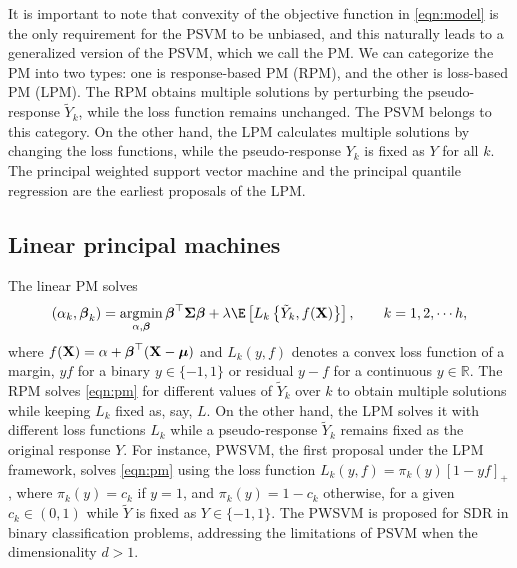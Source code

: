 It is important to note that convexity of the objective function in \eqref{eqn:model} is the only requirement for the PSVM to be unbiased, and this naturally leads to a generalized version of the PSVM, which we call the PM. We can categorize the PM into two types: one is response-based PM (RPM), and the other is loss-based PM (LPM). The RPM obtains multiple solutions by perturbing the pseudo-response $\tilde Y_k$, while the loss function remains unchanged. The PSVM belongs to this category. On the other hand, the LPM calculates multiple solutions by changing the loss functions, while the pseudo-response $Y_k$ is fixed as $Y$ for all $k$. The principal weighted support vector machine \citep[PWSVM,][]{shin2017principal} and the principal quantile regression \citep[PQR,][]{wang2018principal} are the earliest proposals of the LPM.  

\subsection{Linear principal machines} \label{sec:LPSDR}

The linear PM solves
\begin{align} \label{eqn:pm}
(\alpha_{k}, \bbeta_k) = \argmin_{\alpha, \bbeta} \bbeta^\top \bSigma\bbeta + \lambda \E \left[L_{k} \left\{\tilde Y_k, f(\bX)\right\} \right], \qquad k = 1, 2, \cdots h,
\end{align}
where $f(\mathbf{X}) = \alpha + \boldsymbol{\beta}^\top (\mathbf{X} - \boldsymbol{\mu})$ and $L_k(y, f)$ denotes a convex loss function of a margin, $yf$ for a binary $y \in \{-1, 1\}$ or residual $y - f$ for a continuous $y \in \mathbb{R}$. The RPM solves \eqref{eqn:pm} for different values of $\tilde Y_k$ over $k$ to obtain multiple solutions while keeping $L_k$ fixed as, say, $L$. On the other hand, the LPM  solves it with different loss functions $L_k$ while a pseudo-response $\tilde Y_k$ remains fixed as the original response $Y$. For instance, PWSVM, the first proposal under the LPM framework, solves \eqref{eqn:pm} using the loss function $L_k(y, f) = \pi_k(y)[1 - yf]_+$, where $\pi_k(y) = c_k$ if $y = 1$, and $\pi_k(y) = 1 - c_k$ otherwise, for a given $c_k \in (0,1)$ while $\tilde Y$ is fixed as $Y \in \{-1, 1\}$. The PWSVM is proposed for SDR in binary classification problems, addressing the limitations of PSVM when the dimensionality $d > 1$.


